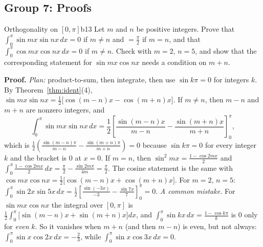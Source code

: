 \documentclass[11pt]{article}
\begin{document}
\subsection*{Group 7: Proofs}

\begin{exmp}{Orthogonality on $[0,\pi]$}{b13}
Let $m$ and $n$ be positive integers. Prove that $\int_0^\pi\sin mx\sin nx\,dx=0$ if $m\ne n$ and $=\frac\pi2$ if $m=n$, and that $\int_0^\pi\cos mx\cos nx\,dx=0$ if $m\ne n$. Check with $m=2$, $n=5$, and show that the corresponding statement for $\sin mx\cos nx$ needs a condition on $m+n$.

\textbf{Proof.} \emph{Plan:} product-to-sum, then integrate, then use $\sin k\pi=0$ for integers $k$. By Theorem~\ref{thm:ident}(4), $\sin mx\sin nx=\frac12\big[\cos(m-n)x-\cos(m+n)x\big]$. If $m\ne n$, then $m-n$ and $m+n$ are nonzero integers, and
\[\int_0^\pi\sin mx\sin nx\,dx=\frac12\left[\frac{\sin(m-n)x}{m-n}-\frac{\sin(m+n)x}{m+n}\right]_0^\pi,\]
which is $\frac12\left(\frac{\sin(m-n)\pi}{m-n}-\frac{\sin(m+n)\pi}{m+n}\right)=0$
because $\sin k\pi=0$ for every integer $k$ and the bracket is $0$ at $x=0$. If $m=n$, then $\sin^2mx=\frac{1-\cos2mx}2$ and $\int_0^\pi\frac{1-\cos2mx}2\,dx=\frac\pi2-\frac{\sin2m\pi}{4m}=\frac\pi2$. The cosine statement is the same with $\cos mx\cos nx=\frac12\big[\cos(m-n)x+\cos(m+n)x\big]$. For $m=2$, $n=5$: $\int_0^\pi\sin2x\sin5x\,dx=\frac12\left[\frac{\sin(-3x)}{-3}-\frac{\sin7x}7\right]_0^\pi=0$.
\emph{A common mistake.} For $\sin mx\cos nx$ the integral over $[0,\pi]$ is $\frac12\int_0^\pi\big[\sin(m-n)x+\sin(m+n)x\big]dx$, and $\int_0^\pi\sin kx\,dx=\frac{1-\cos k\pi}k$ is $0$ only for \emph{even} $k$. So it vanishes when $m+n$ (and then $m-n$) is even, but not always: $\int_0^\pi\sin x\cos2x\,dx=-\frac23$, while $\int_0^\pi\sin x\cos3x\,dx=0$.
\end{exmp}
\end{document}

